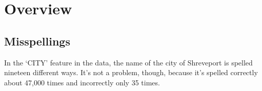 \section{Overview}

\subsection{Misspellings}

In the `CITY' feature in the data, the name of the city of Shreveport is spelled nineteen different ways.  It's not a problem, though, because it's spelled correctly about 47,000 times and incorrectly only 35 times.  
